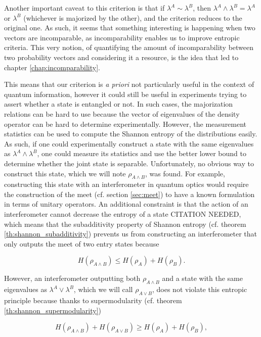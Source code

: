 Another important caveat to this criterion is that if $\lambda^A \sim \lambda^B$, then $\lambda^A \wedge \lambda^B = \lambda^A$ or $\lambda^B$ (whichever is majorized by the other), and the criterion reduces to the original one. As such, it seems that something interesting is happening when two vectors are incomparable, as incomparability enables us to improve entropic criteria. This very notion, of quantifying the amount of incomparability between two probability vectors and considering it a resource, is the idea that led to chapter \ref{chap:incomparability}.


This means that our criterion is \textit{a priori} not particularly useful in the context of quantum information, however it could still be useful in experiments trying to assert whether a state is entangled or not. In such cases, the majorization relations can be hard to use because the vector of eigenvalues of the density operator can be hard to determine experimentally. However, the measurement statistics can be used to compute the Shannon entropy of the distributions easily. As such, if one could experimentally construct a state with the same eigenvalues as $\lambda^A \wedge \lambda^B$, one could measure its statistics and use the better lower bound to determine whether the joint state is separable. Unfortunately, no obvious way to construct this state, which we will note $\rho_{A \wedge B}$, was found. For example, constructing this state with an interferometer in quantum optics would require the construction of the meet (cf. section \ref{sec:meet}) to have a known formulation in terms of unitary operators. An additional constraint is that the action of an interferometer cannot decrease the entropy of a state CITATION NEEDED, which means that the subadditivity property of Shannon entropy (cf. theorem \ref{th:shannon_subadditivity}) prevents us from constructing an interferometer that only outputs the meet of two entry states because

\begin{equation}
    H(\rho_{A \wedge B}) \leq H(\rho_A) + H(\rho_B).
\end{equation}

However, an interferometer outputting both $\rho_{A \wedge B}$ and a state with the same eigenvalues as $\lambda^A \vee \lambda^B$, which we will call $\rho_{A \vee B}$, does not violate this entropic principle because thanks to supermodularity (cf. theorem \ref{th:shannon_supermodularity})

\begin{equation}
    H(\rho_{A \wedge B}) + H(\rho_{A \vee B}) \geq H(\rho_A) + H(\rho_B),
\end{equation}

